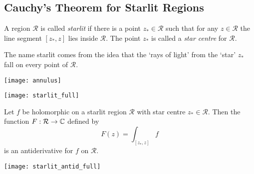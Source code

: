 \subsection{Cauchy's Theorem for Starlit Regions}

\begin{definition}
A region $\mathcal{R}$ is called \emph{starlit} if there is a point $z_{\ast} \in \mathcal{R}$ such that for any $z \in \mathcal{R}$ the line segment $[z_{\ast},z]$ lies inside $\mathcal{R}$.  The point $z_{\ast}$ is called a \emph{star centre} for $\mathcal{R}$.
\end{definition}

The name starlit comes from the idea that the `rays of light' from the `star' $z_{\ast}$ fall on every point of $\mathcal{R}$.  
\begin{note}
\begin{center}
\vspace*{3cm}
\texttt{[image: annulus]}
\end{center}
\vspace*{3cm}
\end{note}

\begin{center}
\texttt{[image: starlit\_full]}
\end{center}

\begin{theorem}
\label{t:starlit}
Let $f$ be holomorphic on a starlit region $\mathcal{R}$ with star centre $z_{\ast} \in \mathcal{R}$.  Then the function $F:\mathcal{R} \to \mathbb{C}$ defined by
\[
F(z) = \int_{[z_{\ast},z]} f
\]
is an antiderivative for $f$ on $\mathcal{R}$.
\end{theorem}
\begin{center}
\texttt{[image: starlit\_antid\_full]}
\end{center}

